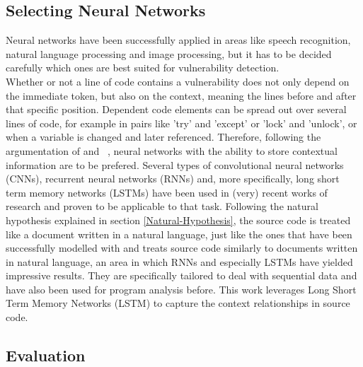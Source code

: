 \documentclass[
	a4paper,
	pagesize,
	pdftex,
	12pt,
	twoside, %
	BCOR=5mm, %
	ngerman,
	fleqn,
	final,
	]{scrartcl}
\begin{document}
\subsection{Selecting Neural Networks}

Neural networks have been successfully applied in areas like speech recognition, natural language processing and image processing, but it has to be decided carefully which ones are best suited for vulnerability detection. \\
Whether or not a line of code contains a vulnerability does not only depend on the immediate token, but also on the context, meaning the lines before and after that specific position. Dependent code elements can be spread out over several lines of code, for example in pairs like 'try' and 'except' or 'lock' and 'unlock', or when a variable is changed and later referenced. Therefore, following the argumentation of \cite{Liu.2018} and ~\cite{Dam.2017}, neural networks with the ability to store contextual information are to be prefered. Several types of convolutional neural networks (CNNs), recurrent neural networks (RNNs) and, more specifically, long short term memory networks (LSTMs) have been used in (very) recent works of research and proven to be applicable to that task. Following the natural hypothesis explained in section \ref{Natural-Hypothesis}, the source code is treated like a document written in a natural language, just like the ones that have been successfully modelled with and treats source code similarly to documents written in natural language, an area in which RNNs and especially LSTMs have yielded impressive results. They are specifically tailored to deal with sequential data and have also been used for program analysis before. This work leverages Long Short Term Memory Networks (LSTM) to capture the context relationships in source code. 



\newpage
\subsection{Evaluation}
\end{document}
